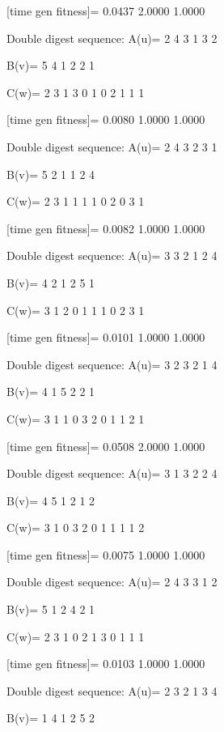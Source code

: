 [time gen fitness]=
    0.0437    2.0000    1.0000

Double digest sequence:
A(u)=
     2     4     3     1     3     2

B(v)=
     5     4     1     2     2     1

C(w)=
     2     3     1     3     0     1     0     2     1     1     1

[time gen fitness]=
    0.0080    1.0000    1.0000

Double digest sequence:
A(u)=
     2     4     3     2     3     1

B(v)=
     5     2     1     1     2     4

C(w)=
     2     3     1     1     1     1     0     2     0     3     1

[time gen fitness]=
    0.0082    1.0000    1.0000

Double digest sequence:
A(u)=
     3     3     2     1     2     4

B(v)=
     4     2     1     2     5     1

C(w)=
     3     1     2     0     1     1     1     0     2     3     1

[time gen fitness]=
    0.0101    1.0000    1.0000

Double digest sequence:
A(u)=
     3     2     3     2     1     4

B(v)=
     4     1     5     2     2     1

C(w)=
     3     1     1     0     3     2     0     1     1     2     1

[time gen fitness]=
    0.0508    2.0000    1.0000

Double digest sequence:
A(u)=
     3     1     3     2     2     4

B(v)=
     4     5     1     2     1     2

C(w)=
     3     1     0     3     2     0     1     1     1     1     2

[time gen fitness]=
    0.0075    1.0000    1.0000

Double digest sequence:
A(u)=
     2     4     3     3     1     2

B(v)=
     5     1     2     4     2     1

C(w)=
     2     3     1     0     2     1     3     0     1     1     1

[time gen fitness]=
    0.0103    1.0000    1.0000

Double digest sequence:
A(u)=
     2     3     2     1     3     4

B(v)=
     1     4     1     2     5     2


